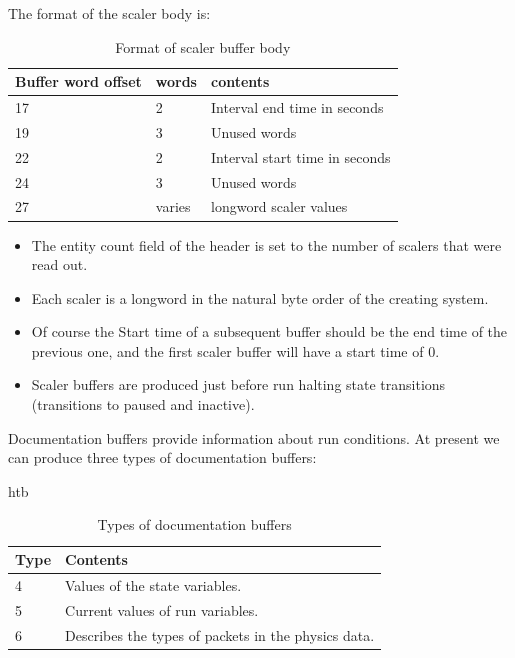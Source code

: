   The format of the scaler body is:
   
   \begin{table}[htb]
      \caption{Format of scaler buffer body}
      \begin{tabular}{|l|l|l|}
      \hline
      {\bf Buffer word offset} & {\bf words} & {\bf contents} \\
      \hline
      17        & 2     & Interval end time in seconds\\
      19        & 3     & Unused words \\
      22        & 2     & Interval start time in seconds\\
      24        & 3     & Unused words \\
      27        & varies & longword scaler values \\
      \hline
      \end{tabular}
   \end{table}
   
   \begin{note}
      \begin{itemize}
         \item The entity count field of the header is
            set to the number of scalers that were read out.
         \item Each scaler is a longword in the natural byte
            order of the creating system.
         \item Of course the Start time of a subsequent 
            buffer should be the end time of the previous one,
            and the first scaler buffer will have a start time of
            0.
         \item Scaler buffers are produced just before run halting
            state transitions (transitions to paused and inactive).
      \end{itemize}
   \end{note}
   
      Documentation buffers provide information about run
      conditions.  At present we can produce three types
      of documentation buffers:
      \begin{table}{htb}
         \caption{Types of documentation buffers}
         \begin{tabular}{|l|l|}
            \hline
            {\bf Type} & {\bf Contents} \\
            \hline
            4   & Values of the state variables. \\
            5   & Current values of run variables. \\
            6   & Describes the types of packets in the physics data. \\
            \hline
         \end{tabular}
      \end{table}
      
